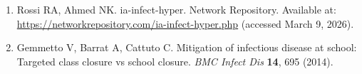 \documentclass[9pt,twocolumn,twoside]{pnas-new}
\begin{document}
\begin{enumerate}
\item Rossi RA, Ahmed NK. ia-infect-hyper. Network Repository. Available at: \url{https://networkrepository.com/ia-infect-hyper.php} (accessed March 9, 2026).

\item Gemmetto V, Barrat A, Cattuto C. Mitigation of infectious disease at school: Targeted class closure vs school closure. \textit{BMC Infect Dis} \textbf{14}, 695 (2014).

\end{enumerate}
\end{document}
